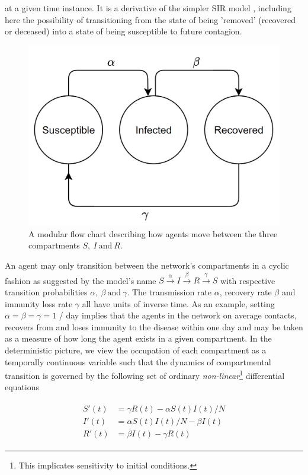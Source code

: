 at a given time instance. It is a derivative of the simpler SIR model \cite{SIR}, including here the possibility of transitioning from the state of being 'removed' (recovered or deceased) into a state of being susceptible to future contagion. 
\begin{figure}[H]
    \centering
    \includegraphics{Figures/SIR.PNG}
    \caption{A modular flow chart describing how agents move between the three compartments $S,\ I\ \text{and}\ R$.}
    \label{fig:SIRS}
\end{figure}
An agent may only transition between the network's compartments in a cyclic fashion as suggested by the model's name $S \overset{\alpha}{\to} I \overset{\beta}{\to} R \overset{\gamma}{\to} S$ with respective transition probabilities $\alpha, \ \beta\ \text{and} \ \gamma$. The transmission rate $\alpha$, recovery rate $\beta$ and immunity loss rate $\gamma$ all have units of inverse time. As an example, setting $\alpha = \beta = \gamma = 1$ / day implies that the agents in the network on average contacts, recovers from and loses immunity to the disease within one day and may be taken as a measure of how long the agent exists in a given compartment. In the deterministic picture, we view the occupation of each compartment as a temporally continuous variable such that the dynamics of compartmental transition is governed by the following set of ordinary \textit{non-linear}\footnote{This implicates sensitivity to initial conditions.} differential equations

\begin{align}
    \begin{split}
        S'(t) &= \gamma R(t) - \alpha S(t)I(t)/N\\
        I'(t) &= \alpha S(t)I(t)/N - \beta I(t)\\
        R'(t) &= \beta I(t) - \gamma R(t)
        \label{SIRS}
    \end{split}
\end{align}

